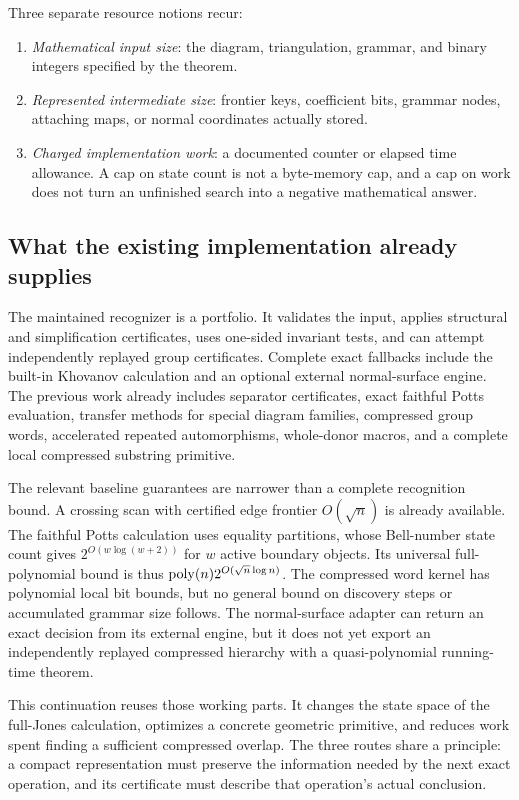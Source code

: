 Three separate resource notions recur:
\begin{enumerate}
\item \emph{Mathematical input size}: the diagram, triangulation, grammar,
and binary integers specified by the theorem.
\item \emph{Represented intermediate size}: frontier keys, coefficient
bits, grammar nodes, attaching maps, or normal coordinates actually stored.
\item \emph{Charged implementation work}: a documented counter or elapsed
time allowance. A cap on state count is not a byte-memory cap, and a cap on
work does not turn an unfinished search into a negative mathematical answer.
\end{enumerate}

\subsection{What the existing implementation already supplies}

The maintained recognizer is a portfolio. It validates the input, applies
structural and simplification certificates, uses one-sided invariant tests,
and can attempt independently replayed group certificates. Complete exact
fallbacks include the built-in Khovanov calculation and an optional external
normal-surface engine. The previous work already includes separator
certificates, exact faithful Potts evaluation, transfer methods for special
diagram families, compressed group words, accelerated repeated automorphisms,
whole-donor macros, and a complete local compressed substring primitive.

The relevant baseline guarantees are narrower than a complete recognition
bound. A crossing scan with certified edge frontier $O(\sqrt n)$ is already
available. The faithful Potts calculation uses equality partitions, whose
Bell-number state count gives $2^{O(w\log(w+2))}$ for $w$ active boundary
objects. Its universal full-polynomial bound is thus
$\operatorname{poly}(n)2^{O(\sqrt n\log n)}$. The compressed word kernel has polynomial
local bit bounds, but no general bound on discovery steps or accumulated
grammar size follows. The normal-surface adapter can return an exact decision
from its external engine, but it does not yet export an independently replayed
compressed hierarchy with a quasi-polynomial running-time theorem.

This continuation reuses those working parts. It changes the state space of
the full-Jones calculation, optimizes a concrete geometric primitive, and
reduces work spent finding a sufficient compressed overlap. The three routes
share a principle: a compact representation must preserve the information
needed by the next exact operation, and its certificate must describe that
operation's actual conclusion.


